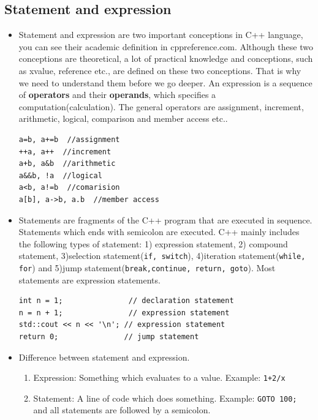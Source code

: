 \documentclass[a4paper,11pt,twoside]{book}
\begin{document}
\subsection{Statement and expression}
\begin{itemize}
	\item Statement and expression are two important conceptions in C++ language, you can see their academic definition in cppreference.com. Although these two conceptions are theoretical, a lot of practical knowledge and conceptions, such as xvalue, reference etc., are defined on these two conceptions. That is why we need to understand them before we go deeper. An expression is a sequence of \textbf{operators} and their \textbf{operands}, which specifies a computation(calculation). The general operators are assignment, increment, arithmetic, logical, comparison and member access etc..
	
\begin{lstlisting}[numbers=none]
a=b, a+=b  //assignment
++a, a++  //increment
a+b, a&b  //arithmetic
a&&b, !a  //logical
a<b, a!=b  //comarision
a[b], a->b, a.b  //member access
\end{lstlisting}
	
	\item Statements are fragments of the C++ program that are executed in sequence. Statements which ends with semicolon are executed. C++ mainly includes the following types of statement: 1) expression statement, 2) compound statement, 3)selection statement(\texttt{if, switch}), 4)iteration statement(\texttt{while, for}) and 5)jump statement(\texttt{break,continue, return, goto}). Most statements are expression statements.
	
\begin{lstlisting}[numbers=none]
int n = 1;               // declaration statement
n = n + 1;               // expression statement
std::cout << n << '\n'; // expression statement
return 0;               // jump statement
\end{lstlisting}
	
\item Difference between statement and expression.
	\begin{enumerate}
		\item Expression: Something which evaluates to a value. Example: \texttt{1+2/x}
		
		\item Statement: A line of code which does something. Example: \texttt{GOTO 100;} and all statements are followed by a semicolon.
	

\end{enumerate}
\end{itemize}
\end{document}
